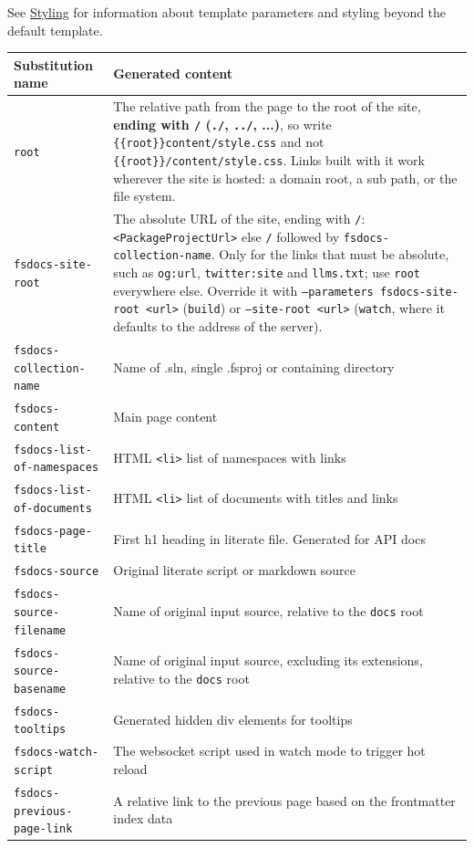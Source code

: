 \documentclass{article}
\begin{document}
See \href{styling.html}{Styling} for information about template parameters and styling beyond the default template.
\begin{tabular}{|l|l|}\hline
\textbf{Substitution name} & \textbf{Generated content}\\ \hline\hline
\texttt{root} & The relative path from the page to the root of the site, \textbf{ending with \texttt{/} (\texttt{./}, \texttt{../}, ...)}, so write \texttt{\{\{root\}\}content/style.css} and not \texttt{\{\{root\}\}/content/style.css}. Links built with it work wherever the site is hosted: a domain root, a sub path, or the file system.\\ \hline
\texttt{fsdocs-site-root} & The absolute URL of the site, ending with \texttt{/}: \texttt{<PackageProjectUrl>} else \texttt{/} followed by \texttt{fsdocs-collection-name}. Only for the links that must be absolute, such as \texttt{og:url}, \texttt{twitter:site} and \texttt{llms.txt}; use \texttt{root} everywhere else. Override it with \texttt{--parameters fsdocs-site-root <url>} (\texttt{build}) or \texttt{--site-root <url>} (\texttt{watch}, where it defaults to the address of the server).\\ \hline
\texttt{fsdocs-collection-name} & Name of .sln, single .fsproj or containing directory\\ \hline
\texttt{fsdocs-content} & Main page content\\ \hline
\texttt{fsdocs-list-of-namespaces} & HTML \texttt{<li>} list of namespaces with links\\ \hline
\texttt{fsdocs-list-of-documents} & HTML \texttt{<li>} list of documents with  titles and links\\ \hline
\texttt{fsdocs-page-title} & First h1 heading in literate file. Generated for API docs\\ \hline
\texttt{fsdocs-source} & Original literate script or markdown source\\ \hline
\texttt{fsdocs-source-filename} & Name of original input source, relative to the \texttt{docs} root\\ \hline
\texttt{fsdocs-source-basename} & Name of original input source, excluding its extensions, relative to the \texttt{docs} root\\ \hline
\texttt{fsdocs-tooltips} & Generated hidden div elements for tooltips\\ \hline
\texttt{fsdocs-watch-script} & The websocket script used in watch mode to trigger hot reload\\ \hline
\texttt{fsdocs-previous-page-link} & A relative link to the previous page based on the frontmatter index data\\ \hline

\end{tabular}
\end{document}
